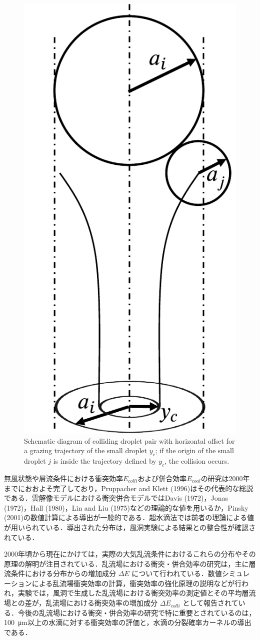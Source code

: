 \begin{figure}[b]
    \centering
    \includegraphics[width=0.4\linewidth]{./Figure/1_Introduction/yc.pdf}
    \caption{Schematic diagram of colliding droplet pair with horizontal offset for a grazing trajectory of the small droplet $y_c$; if the origin of the small droplet $j$ is inside the trajectory defined by $y_c$, the collision occurs.}
    \label{fig:horizontaloffset}
\end{figure}
無風状態や層流条件における衝突効率$E_{colli}$および併合効率$E_{coal}$の研究は2000年までにおおよそ完了しており，Pruppacher and Klett (1996)\cite{pruppacher1996}はその代表的な総説である．雲解像モデルにおける衝突併合モデルではDavis (1972)\cite{davis1972}，Jonas (1972)\cite{jonas1972}，Hall (1980)\cite{hall1980}，Lin and Liu (1975)\cite{linliu1975}などの理論的な値を用いるか，Pinsky (2001)\cite{pinsky2001}の数値計算による導出が一般的である．超水滴法では前者の理論による値が用いられている．導出された分布は，風洞実験による結果との整合性が確認されている\cite{abbott1974, telford1955, woods1964}．

2000年頃から現在にかけては，実際の大気乱流条件におけるこれらの分布やその原理の解明が注目されている．乱流場における衝突・併合効率の研究は，主に層流条件における分布からの増加成分 $\Delta E$ について行われている．数値シミュレーションによる乱流場衝突効率の計算\cite{pinsky2008Part5}，衝突効率の強化原理の説明\cite{pinsky2007Part4}などが行われ，実験では，風洞で生成した乱流場における衝突効率の測定値とその平均層流場との差が，乱流場における衝突効率の増加成分 $\Delta E_{colli}$ として報告されている\cite{vohl1999}．今後の乱流場における衝突・併合効率の研究で特に重要とされているのは，\SI{100}{\um}以上の水滴に対する衝突効率の評価と，水滴の分裂確率カーネルの導出である\cite{khain2018}．

